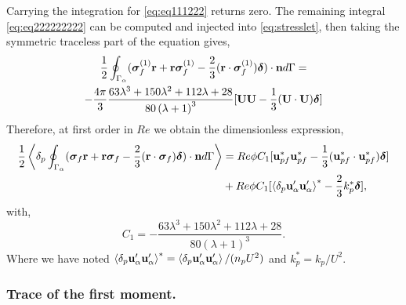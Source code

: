 Carrying the integration for  \ref{eq:eq111222} returns zero. 
The remaining integral \eqref{eq:eq222222222} can be computed and injected into \ref{eq:stresslet}, then taking the symmetric traceless part of the equation gives, 
\begin{multline}
    \frac{1}{2}\oint_{\Gamma_{\alpha}} (\bm\sigma_f^{(1)} \textbf{r} + \textbf{r} \bm\sigma_f^{(1)} -\frac{2}{3}(\textbf{r} \cdot \bm\sigma_f^{(1)} )\bm\delta)\cdot \textbf{n} d\Gamma
    = \\
    - \frac{4\pi}{3}\frac{63 \lambda^{3} + 150 \lambda^{2} + 112 \lambda + 28}{80 \left(\lambda + 1\right)^{3}}
    [
        \textbf{UU} - \frac{1}{3}(\textbf{U}\cdot \textbf{U})\bm\delta 
    ]
\end{multline}
Therefore, at first order in $Re$ we obtain the dimensionless expression, 
\begin{align}
    \frac{1}{2}\pSavg{ (\bm\sigma_f \textbf{r} + \textbf{r} \bm\sigma_f -\frac{2}{3}(\textbf{r} \cdot \bm\sigma_f )\bm\delta) \cdot \textbf{n}}
    &= 
    Re \phi C_1
    [
        \textbf{u}_{pf}^*\textbf{u}_{pf}^* - \frac{1}{3}(\textbf{u}_{pf}^*\cdot \textbf{u}_{pf}^*)\bm\delta 
    ]\\
    &+ Re \phi  C_1 
    [
        \pavg{\textbf{u}_\alpha'\textbf{u}_\alpha'}^* - \frac{2}{3}k_p^*\bm\delta 
    ],
    \label{eq:sol1} 
\end{align}
with, 
\begin{equation}
    C_1 = - \frac{63 \lambda^{3} + 150 \lambda^{2} + 112 \lambda + 28}{80 \left(\lambda + 1\right)^{3}}. 
\end{equation}
Where we have noted $\left<\delta_{p} \textbf{u}_\alpha'\textbf{u}_\alpha'\right>^* = \left<\delta_{p} \textbf{u}_\alpha'\textbf{u}_\alpha'\right>/(n_p U^2)$ and $k_p^* = k_p/U^2$. 
 

\subsubsection{Trace of the first moment.}

